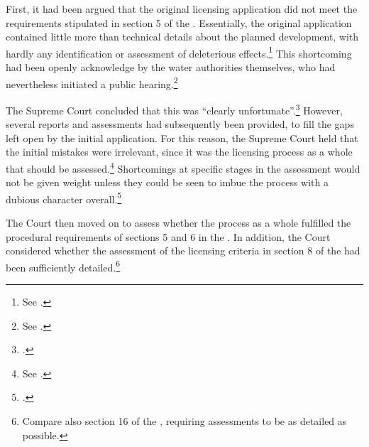 First, it had been argued that the original licensing application did not meet the requirements stipulated in section 5 of the \cite{wra17}. Essentially, the original application contained little more than technical details about the planned development, with hardly any identification or assessment of deleterious effects.\footnote{See \cite[264-265]{alta82}.} This shortcoming had been openly acknowledge by the water authorities themselves, who had nevertheless initiated a public hearing.\footnote{See \cite[265]{alta82}.}

The Supreme Court concluded that this was ``clearly unfortunate''.\footcite[265]{alta82} However, several reports and assessments had subsequently been provided, to fill the gaps left open by the initial application. For this reason, the Supreme Court held that the initial mistakes were irrelevant, since it was the licensing process as a whole that should be assessed.\footnote{See \cite[265-266]{alta82}.} Shortcomings at specific stages in the assessment would not be given weight unless they could be seen to imbue the process with a dubious character overall.\footcite[265]{alta82}

The Court then moved on to assess whether the process as a whole fulfilled the procedural requirements of sections 5 and 6 in the \cite{wra17}. In addition, the Court considered whether the assessment of the licensing criteria in section 8 of the \cite{wra17} had been sufficiently detailed.\footnote{Compare also section 16 of the \cite{paa67}, requiring assessments to be as detailed as possible.}

